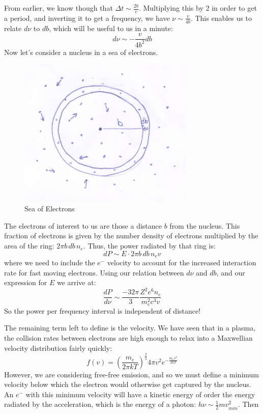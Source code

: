 \documentclass{article}
\def\hf{\frac12}
\def\hf{\frac12}
\begin{document}
From earlier, we know though that $\Delta t\sim\frac{2b }{ v}$.  Multiplying this by 2 in order to get a period, and inverting it to get a frequency, we have $\nu\sim\frac{v }{ 4b}$.  
This enables us to relate $d\nu$ to
$db$, which will be useful to us in a minute:
$$d\nu\sim{-\frac{v}{4b^2}}db$$
Now let's consider a nucleus in a sea of electrons.  
\begin{figure}
    \centering
    \includegraphics[width=0.75\textwidth]{707px-ElectronSea.jpg}
    \caption{Sea of Electrons}
    \label{fig:sea}
\end{figure}
The electrons of interest to us are those a distance $b$ from the nucleus.  This fraction of electrons is given by the number density of electrons multiplied by the area of the ring: $2\pi b\,db\,n_e$.
Thus, the power radiated by that ring is:
$$dP\sim E\cdot 2\pi b\,db\,n_ev$$
where we need to include the $e^-$ velocity to account for the increased interaction rate for fast moving electrons. 
Using our relation between $d\nu$ and $db$, and our expression for $E$ we arrive at:
$$\frac{dP}{ d\nu}\sim\frac{-32\pi}{3}\frac{Z^2e^6n_e}{ m_e^2c^3v}$$
So the power per frequency interval is independent of distance!\par
The remaining term left to define is the velocity.  We have seen that in a plasma, the collision rates between electrons are high enough to relax into a Maxwellian velocity distribution fairly quickly:
$$f(v)=\left(\frac{m_e}{2\pi kT}\right)^\frac{3}{2}4\pi v^2 e^{-\frac{m_ev^2}{2kT}}$$
However, we are considering free-free emission, and so we must define a minimum velocity below which the electron would otherwise get captured by the nucleus. An $e^-$ with this minimum velocity will have a kinetic energy of order the energy radiated by the acceleration, which is the energy of a photon: $h\nu\sim\hf mv_{min}^2$.  Then
\end{document}
